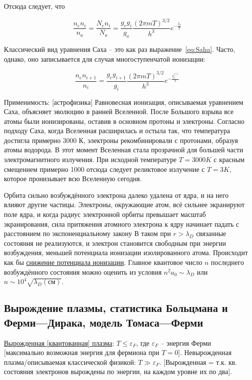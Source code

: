\documentclass[10pt, a4paper]{article}
\begin{document}
Отсюда следует, что

\begin{equation} \label{eq:Saha}
	\frac{n_en_i}{n_a} = \frac{N_en_i}{N_a} = \frac{g_eg_i}{g_a} \frac{(2\pi mT)^{3/2}}{h^3}e^{-\frac{I_p}{T}}
\end{equation}

Классический вид уравнения Саха -- это как раз выражение~\eqref{eq:Saha}. Часто, однако, оно записывается для случая многоступенчатой ионизации:

\begin{equation*}
	\frac{n_en_{i+1}}{n_i} = \frac{g_eg_{i+1}}{g_i} \frac{(2\pi mT)^{3/2}}{h^3}e^{-\frac{I_p^{(i)}}{T}}
\end{equation*}

Применимость: [астрофизика] Равновесная ионизация, описываемая уравнением Саха, объясняет эволюцию в ранней Вселенной. После Большого взрыва все атомы были ионизированы, оставив в основном протоны и электроны. Согласно подходу Саха, когда Вселенная расширилась и остыла так, что температура достигла примерно 3000 К, электроны рекомбинировали с протонами, образуя атомы водорода. В этот момент Вселенная стала прозрачной для большей части электромагнитного излучения. При исходной температуре $T = 3000 K$ с красным смещением примерно 1000 отсюда следует реликтовое излучение с $T = 3 K$, которое пронизывает всю Вселенную сегодня. 

Орбита сильно возбуждённого электрона далеко удалена от ядра, и на него влияют другие частицы. Электроны, окружающие атом, всё сильнее экранируют поле ядра, и когда радиус электронной орбиты превышает масштаб экранирования, сила притяжения атомного электрона к ядру начинает падать с расстоянием по экспоненциальному закону В таком при $r>\lambda_D$ связанные состояния не реализуются, и электрон становится свободным при энергии возбуждения, меньшей потенциала ионизации изолированного атома. Происходит как бы \uline{снижение потенциала ионизации}. Главное квантовое число $n$ последнего возбуждённого состояния можно оценить из условия $n^2a_0 \sim \lambda_D$ или $n \sim 10^4\sqrt{\lambda_D(\text{см})}$.

\subsection{Вырождение плазмы, статистика Больцмана и Ферми—Дирака, модель Томаса—Ферми}

\uline{Вырожденная [квантованная] плазма}: $T \leq \varepsilon_F$, где $\varepsilon_F$ -- энергия Ферми [максимально возможная энергия для фермиона при $T=0$]. Невырожденная плазма/описываемая классической физикой: $T \gg \varepsilon_F$. [Вырожденная = т.к. кв. состояния электронов вырождены по энергии, на каждом уровне их по два].
\end{document}
